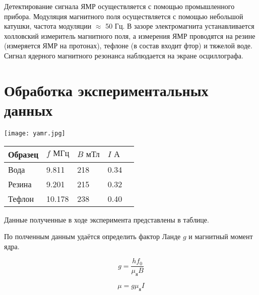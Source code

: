 \documentclass[a4paper, 14pt]{article}
\begin{document}
Детектирование сигнала ЯМР осуществляется с помощью промышленного прибора. Модуляция магнитного поля осуществляется с помощью небольшой катушки, частота модуляции $\approx$ 50 Гц. В зазоре электромагнита устанавливается холловский измеритель магнитного поля, а измерения ЯМР проводятся на резине (измеряется ЯМР на протонах), тефлоне (в состав входит фтор) и тяжелой воде.\\
Сигнал ядерного магнитного резонанса наблюдается на экране осциллографа.




\section*{\textcolor{header}{Обработка экспериментальных данных}}

\begin{minipage}{0.5\textwidth}
    
    \centering
    \texttt{[image: yamr.jpg]}
    \label{<label>}
\end{minipage}
\begin{minipage}{0.5\textwidth}

    \begin{center}
    
    \begin{tabular}{|l|l|l|l|l|}
    \hline
    Образец & $f \text{ МГц}$ & $B \text{ мТл}$ & $I \text{ А}$   \\ \hline
    Вода    & 9.811           & 218             & 0.34            \\ \hline
    Резина  & 9.201           & 215             & 0.32            \\ \hline
    Тефлон  & 10.178          & 238             & 0.40            \\ \hline
    \end{tabular}
\end{center}


\end{minipage}
Данные полученные в ходе эксперимента представлены в таблице.

По полченным данным удаётся определить фактор Ланде $g$ и магнитный момент ядра.

\begin{equation}
    g = \frac{h f_{0}}{\mu_{\text{я}} B}
\end{equation}



\begin{equation}
    \mu = g  \mu_{\text{я}} I
\end{equation}
\end{document}
